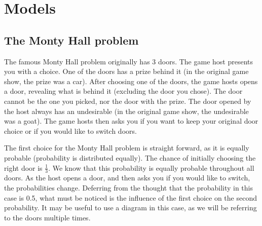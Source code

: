 \documentclass{article}
\begin{document}
\section*{Models}
\subsection*{The Monty Hall problem}
The famous Monty Hall problem originally has 3 doors. The game host presents you with a choice. One of the doors has a prize behind it (in the original game show, the prize was a car). After choosing one of the doors, the game hosts opens a door, revealing what is behind it (excluding the door you chose). The door cannot be the one you picked, nor the door with the prize. The door opened by the host always has an undesirable (in the original game show, the undesirable was a goat). The game hosts then asks you if you want to keep your original door choice or if you would like to switch doors. 
\par
The first choice for the Monty Hall problem is straight forward, as it is equally probable (probability is distributed equally). The chance of initially choosing the right door is $\frac{1}{3}$. We know that this probability is equally probable throughout all doors. As the host opens a door, and then asks you if you would like to switch, the probabilities change. Deferring from the thought that the probability in this case is 0.5, what must be noticed is the influence of the first choice on the second probability. It may be useful to use a diagram in this case, as we will be referring to the doors multiple times.
\end{document}
